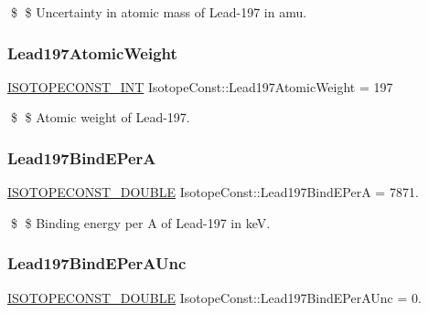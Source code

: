\$ \$ Uncertainty in atomic mass of Lead-\/197 in amu. \mbox{\label{group___isotope_const-_lead-_pb197_gac1d8cb91d8cd38a3c3651254bd59b10b}} 
\subsubsection{\texorpdfstring{Lead197\+Atomic\+Weight}{Lead197AtomicWeight}}
{\footnotesize\ttfamily \mbox{\hyperlink{group___isotope_const-_macros_ga5f18360b3e99483a35c32d789e62621c}{I\+S\+O\+T\+O\+P\+E\+C\+O\+N\+S\+T\+\_\+\+I\+NT}} Isotope\+Const\+::\+Lead197\+Atomic\+Weight = 197}

\$ \$ Atomic weight of Lead-\/197. \mbox{\label{group___isotope_const-_lead-_pb197_ga403e6f2e559c5234c0018ccea659d302}} 
\subsubsection{\texorpdfstring{Lead197\+Bind\+E\+PerA}{Lead197BindEPerA}}
{\footnotesize\ttfamily \mbox{\hyperlink{group___isotope_const-_macros_ga8f45a7272ce02c0b4c65c44636ed719a}{I\+S\+O\+T\+O\+P\+E\+C\+O\+N\+S\+T\+\_\+\+D\+O\+U\+B\+LE}} Isotope\+Const\+::\+Lead197\+Bind\+E\+PerA = 7871.}

\$ \$ Binding energy per A of Lead-\/197 in keV. \mbox{\label{group___isotope_const-_lead-_pb197_gaaa90e2de0093f2b80b348fabbd995dcf}} 
\subsubsection{\texorpdfstring{Lead197\+Bind\+E\+Per\+A\+Unc}{Lead197BindEPerAUnc}}
{\footnotesize\ttfamily \mbox{\hyperlink{group___isotope_const-_macros_ga8f45a7272ce02c0b4c65c44636ed719a}{I\+S\+O\+T\+O\+P\+E\+C\+O\+N\+S\+T\+\_\+\+D\+O\+U\+B\+LE}} Isotope\+Const\+::\+Lead197\+Bind\+E\+Per\+A\+Unc = 0.}

